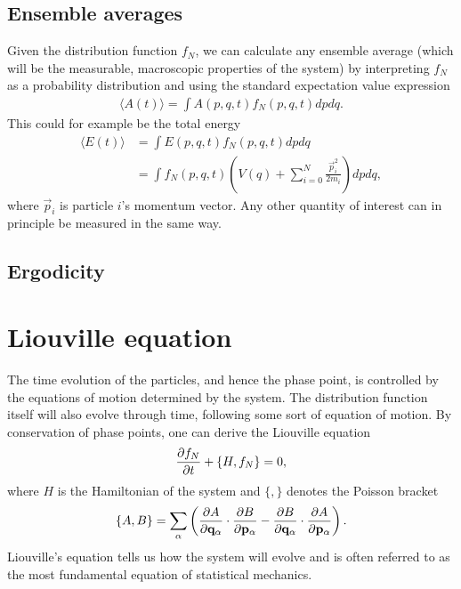 \subsection{Ensemble averages}
Given the distribution function $f_N$, we can calculate any ensemble average (which will be the measurable, macroscopic properties of the system) by interpreting $f_N$ as a probability distribution and using the standard expectation value expression
\begin{align}
	\langle A(t) \rangle = \int A(p, q, t)f_N(p, q, t)dpdq.
\end{align}
This could for example be the total energy
\begin{align}
	\langle E(t) \rangle &= \int E(p, q, t)f_N(p, q, t)dpdq \\
	&= \int f_N(p, q, t)\left(V(q) + \sum_{i=0}^N \frac{\vec p_i^2}{2m_i} \right)dpdq,
\end{align}
where $\vec p_i$ is particle $i$'s momentum vector. Any other quantity of interest can in principle be measured in the same way. 
\subsection{Ergodicity}


\section{Liouville equation}
The time evolution of the particles, and hence the phase point, is controlled by the equations of motion determined by the system. The distribution function itself will also evolve through time, following some sort of equation of motion. By conservation of phase points, one can derive the Liouville equation
\begin{align}
	\frac{\partial f_N}{\partial t} + \{H, f_N\} = 0,
\end{align}
where $H$ is the Hamiltonian of the system and $\{,\}$ denotes the Poisson bracket
\begin{align}
	\{A,B\} = \sum_\alpha\left( \frac{\partial A}{\partial \mathbf q_\alpha}\cdot\frac{\partial B}{\partial \mathbf p_\alpha} - \frac{\partial B}{\partial \mathbf q_\alpha}\cdot\frac{\partial A}{\partial \mathbf p_\alpha}\right).
\end{align}
 Liouville's equation tells us how the system will evolve and is often referred to as the most fundamental equation of statistical mechanics\cite{mcquarrie1973statistical}. 
